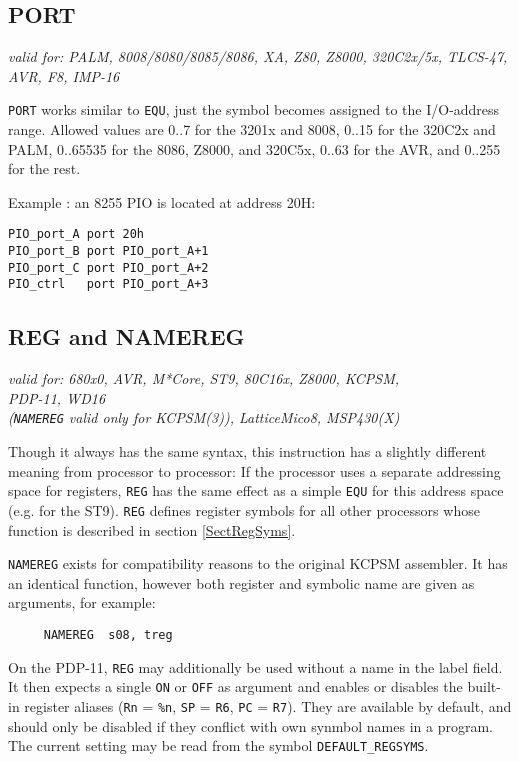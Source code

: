 \documentclass[12pt,twoside]{report}
\makeatletter
\newcommand{\tty}[1]{{\tt #1}}
\newcommand{\ttindex}[1]{\index{#1@{\tt #1}}}
\makeatother
\begin{document}

\subsection{PORT}
\ttindex{PORT}

{\em valid for: PALM, 8008/8080/8085/8086, XA, Z80, Z8000, 320C2x/5x, TLCS-47, AVR,
     F8, IMP-16}

\tty{PORT} works similar to \tty{EQU}, just the symbol becomes assigned to the
I/O-address range.  Allowed values are 0..7 for the 3201x and 8008, 0..15 for the
320C2x and PALM, 0..65535 for the 8086, Z8000, and 320C5x, 0..63 for the AVR, and 0..255
for the rest.

Example : an 8255 PIO is located at address 20H:
\begin{verbatim}
PIO_port_A port 20h
PIO_port_B port PIO_port_A+1
PIO_port_C port PIO_port_A+2
PIO_ctrl   port PIO_port_A+3
\end{verbatim}


\subsection{REG and NAMEREG}
\ttindex{REG}\ttindex{NAMEREG}

{\em valid for: 680x0, AVR, M*Core, ST9, 80C16x, Z8000, KCPSM, \\
     PDP-11, WD16 \\
     ({\tt NAMEREG} valid only for KCPSM(3)), LatticeMico8, MSP430(X)}

Though it always has the same syntax, this instruction has a slightly
different meaning from processor to processor:  If the processor uses a
separate addressing space for registers, \tty{REG} has the same effect as
a simple \tty{EQU} for this address space (e.g. for the ST9).  \tty{REG}
defines register symbols for all other processors whose function is
described in section \ref{SectRegSyms}.

{\tt NAMEREG} exists for compatibility reasons to the original KCPSM
assembler.  It has an identical function, however both register and
symbolic name are given as arguments, for example:
\begin{verbatim}
     NAMEREG  s08, treg
\end{verbatim}

On the PDP-11, \tty{REG} may additionally be used without a name in the
label field.  It then expects a single \tty{ON} or \tty{OFF} as argument
and enables or disables the built-in register aliases (\tty{Rn} = \tty{\%n},
\tty{SP} = \tty{R6}, \tty{PC} = \tty{R7}).  They are available by default,
and should only be disabled if they conflict with own synmbol names in a
program. The current setting may be read from the symbol \tty{DEFAULT\_REGSYMS}.
\end{document}
